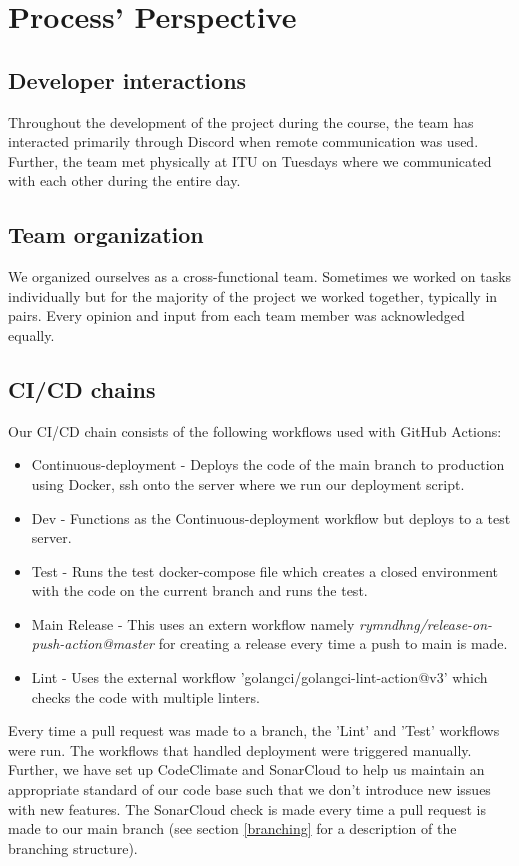 \section{Process' Perspective}

\subsection{Developer interactions}
Throughout the development of the project during the course, the team has interacted primarily through Discord when remote communication was used. 
Further, the team met physically at ITU on Tuesdays where we communicated with each other during the entire day. 

\subsection{Team organization}
We organized ourselves as a cross-functional team. Sometimes we worked on tasks individually but for the majority of the project we worked together, 
typically in pairs. Every opinion and input from each team member was acknowledged equally. 

\subsection{CI/CD chains}
Our CI/CD chain consists of the following workflows used with GitHub Actions:
\begin{itemize}
    \item Continuous-deployment - Deploys the code of the main branch to production using Docker, ssh onto the server where we run our deployment script.
    \item Dev - Functions as the Continuous-deployment workflow but deploys to a test server.
    \item Test - Runs the test docker-compose file which creates a closed environment with the code on the current branch and runs the test.
    \item Main Release - This uses an extern workflow namely \textit{rymndhng/release-on-push-action@master} for creating a release every time a push to main is made.
    \item Lint - Uses the external workflow 'golangci/golangci-lint-action@v3' which checks the code with multiple linters.
\end{itemize}

Every time a pull request was made to a branch, the 'Lint' and 'Test' workflows were run. The workflows that handled deployment were triggered manually.
Further, we have set up CodeClimate and SonarCloud to help us maintain an appropriate standard of our code base such that we don't introduce new issues
with new features. The SonarCloud check is made every time a pull request is made to our main branch (see section \ref{branching} for a description of the 
branching structure).

